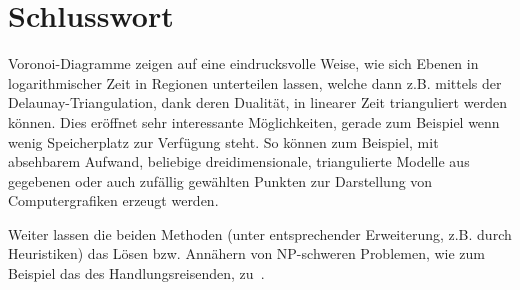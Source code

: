 \section{Schlusswort}
\label{chap:ending}
Voronoi-Diagramme zeigen auf eine eindrucksvolle Weise, wie sich Ebenen in logarithmischer Zeit in Regionen unterteilen lassen, welche dann z.B. mittels der Delaunay-Triangulation, dank deren Dualität, in linearer Zeit trianguliert werden können. Dies eröffnet sehr interessante Möglichkeiten, gerade zum Beispiel wenn wenig Speicherplatz zur Verfügung steht. So können zum Beispiel, mit absehbarem Aufwand, beliebige dreidimensionale, triangulierte Modelle aus gegebenen oder auch zufällig gewählten Punkten zur Darstellung von Computergrafiken erzeugt werden.

Weiter lassen die beiden Methoden (unter entsprechender Erweiterung, z.B. durch Heuristiken) das Lösen bzw. Annähern von NP-schweren Problemen, wie zum Beispiel das des Handlungsreisenden, zu~\parencite{schmitting2007}.

